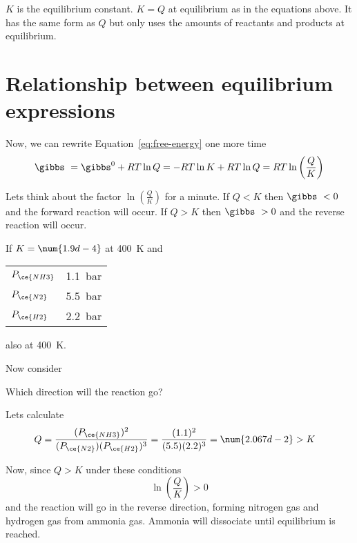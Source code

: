 \documentclass[../mit-general-chemistry.tex]{subfiles}
\begin{document}
$K$ is the equilibrium constant. $K = Q$ at equilibrium as in the
equations above. It has the same form as $Q$ but only uses the amounts
of reactants and products at equilibrium.






\section{Relationship between equilibrium expressions}




Now, we can rewrite Equation~\ref{eq:free-energy} one more time
\begin{equation}
  \gibbs\ = \gibbs^0 + RT \ln Q = -RT \ln K + RT \ln Q = RT \ln\left(\frac{Q}{K}\right)
\end{equation}

Lets think about the factor $\ln\left(\frac{Q}{K}\right)$ for a
minute. If $Q < K$ then $\gibbs\ < 0$ and the forward reaction will
occur. If $Q > K$ then $\gibbs\ > 0$ and the reverse reaction will
occur.


\begin{example}
  If $K = \num{1.9d-4}$ at \SI{400}{\kelvin} and
  \begin{center}
    \begin{tabular}{ll}
      $P_{\ce{NH3}}$ & \SI{1.1}{\bar} \\
      $P_{\ce{N2}}$ & \SI{5.5}{\bar} \\
      $P_{\ce{H2}}$ & \SI{2.2}{\bar} \\
    \end{tabular}
  \end{center}
  also at \SI{400}{\kelvin}.

  Now consider

  Which direction will the reaction go?

  Lets calculate
  \begin{align*}
    Q &= \frac{(P_{\ce{NH3}})^2}{(P_{\ce{N2}})(P_{\ce{H2}})^3} =
    \frac{(1.1)^2}{(5.5)(2.2)^3} =
    \num{2.067d-2} > K
  \end{align*}

  Now, since $Q > K$ under these conditions
  \begin{equation*}
    \ln\left(\frac{Q}{K}\right) > 0
  \end{equation*}
  and the reaction will go in the
  reverse direction, forming nitrogen gas and hydrogen gas from ammonia
  gas. Ammonia will dissociate until equilibrium is reached.
\end{example}
\end{document}
